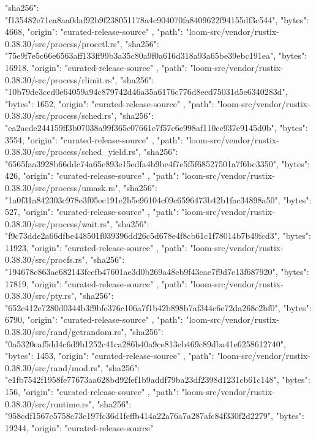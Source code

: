 {{      "sha256": "f135482e71ea8aa0daf92b9f238051178a4c904070fa8409622f94155df3c544",
      "bytes": 4668,
      "origin": "curated-release-source"
    },
    {
      "path": "loom-src/vendor/rustix-0.38.30/src/process/procctl.rs",
      "sha256": "75e9f7e5c66e6563aff133ff99b3a35c80a9f0a616d318a93a65be39ebc191ea",
      "bytes": 16918,
      "origin": "curated-release-source"
    },
    {
      "path": "loom-src/vendor/rustix-0.38.30/src/process/rlimit.rs",
      "sha256": "10b79de3ced0e64059a94c879742d46a35a6176c776d8eed75031d5e6340283d",
      "bytes": 1652,
      "origin": "curated-release-source"
    },
    {
      "path": "loom-src/vendor/rustix-0.38.30/src/process/sched.rs",
      "sha256": "ea2acde244159ff3b07038a99f365c07661e7f57c6e998af110ce937e9145d0b",
      "bytes": 3554,
      "origin": "curated-release-source"
    },
    {
      "path": "loom-src/vendor/rustix-0.38.30/src/process/sched_yield.rs",
      "sha256": "6565faa3928b66ddc74a65e893e15edfa4b9be4f7e5f5f68527501a7f6bc3350",
      "bytes": 426,
      "origin": "curated-release-source"
    },
    {
      "path": "loom-src/vendor/rustix-0.38.30/src/process/umask.rs",
      "sha256": "1a0f31a842303c978e3f05ec191e2b5e96104c09c6596473b42b1fac34898a50",
      "bytes": 527,
      "origin": "curated-release-source"
    },
    {
      "path": "loom-src/vendor/rustix-0.38.30/src/process/wait.rs",
      "sha256": "f9c73dde2a66dfbe448501f039396dd26c5d678e4f8cb61c1f78014b7b49fcd3",
      "bytes": 11923,
      "origin": "curated-release-source"
    },
    {
      "path": "loom-src/vendor/rustix-0.38.30/src/procfs.rs",
      "sha256": "194678c863ae682143fcefb47601ae3d0b269a48eb9f43cae7f9d7e13f687920",
      "bytes": 17819,
      "origin": "curated-release-source"
    },
    {
      "path": "loom-src/vendor/rustix-0.38.30/src/pty.rs",
      "sha256": "652c412e7280d0344b3f9bfe376c106a7f1b42b898b7af344e6e72da268e2bf0",
      "bytes": 6790,
      "origin": "curated-release-source"
    },
    {
      "path": "loom-src/vendor/rustix-0.38.30/src/rand/getrandom.rs",
      "sha256": "0a5320eaf5dd4c6d9b1252c41ca286b40a9ce813eb469c89dba41e6258612740",
      "bytes": 1453,
      "origin": "curated-release-source"
    },
    {
      "path": "loom-src/vendor/rustix-0.38.30/src/rand/mod.rs",
      "sha256": "e1fb7542f1958fe77673aa628bd92fef1b9addf79ba23df2398d1231cb61c148",
      "bytes": 156,
      "origin": "curated-release-source"
    },
    {
      "path": "loom-src/vendor/rustix-0.38.30/src/runtime.rs",
      "sha256": "958cdf1567c5758c73c197fc36d1feffb414a22a76a7a287afc84f330f2d2279",
      "bytes": 19244,
      "origin": "curated-release-source"
}}
